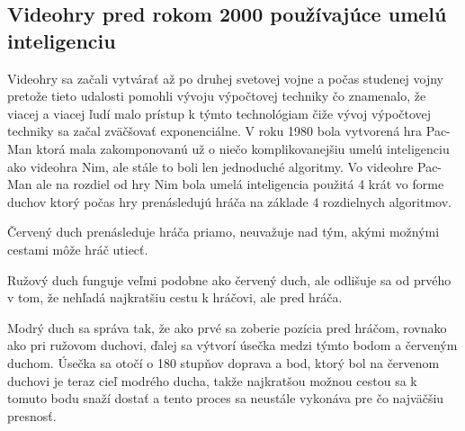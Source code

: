 \documentclass[10pt,oneside,slovak,a4paper]{article}
\begin{document}
\subsection{Videohry pred rokom 2000 používajúce umelú inteligenciu} \label{kapitola2.2}
Videohry sa začali vytvárať až po druhej svetovej vojne a počas studenej vojny pretože tieto udalosti pomohli vývoju výpočtovej techniky čo znamenalo, že viacej a viacej ľudí malo prístup k týmto technológiam čiže vývoj výpočtovej techniky sa začal zväčšovať exponenciálne. V roku 1980 bola vytvorená hra Pac-Man ktorá mala zakomponovanú už o niečo komplikovanejšiu umelú inteligenciu ako videohra Nim, ale stále to boli len jednoduché algoritmy. Vo videohre Pac-Man ale na rozdiel od hry Nim bola umelá inteligencia použitá 4 krát vo forme duchov ktorý počas hry prenásledujú hráča na základe 4 rozdielnych algoritmov. \cite{PacmanAI}

Červený duch prenásleduje hráča priamo, neuvažuje nad tým, akými možnými cestami môže hráč utiecť.

Ružový duch funguje veľmi podobne ako červený duch, ale odlišuje sa od prvého v tom, že nehľadá najkratšiu cestu k hráčovi, ale pred hráča.

Modrý duch sa správa tak, že ako prvé sa zoberie pozícia pred hráčom, rovnako ako pri ružovom duchovi, ďalej sa výtvorí úsečka medzi týmto bodom a červeným duchom. Úsečka sa otočí o 180 stupňov doprava a bod, ktorý bol na červenom duchovi je teraz cieľ modrého ducha, takže najkratšou možnou cestou sa k tomuto bodu snaží dostať a tento proces sa neustále vykonáva pre čo najväčšiu presnosť.
\end{document}

